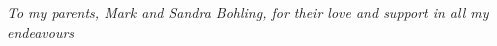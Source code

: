 \chapter*{}
\begin{center}
{\centering \it To my parents,
Mark and Sandra Bohling,
for their love and support in all my endeavours}
\end{center} 